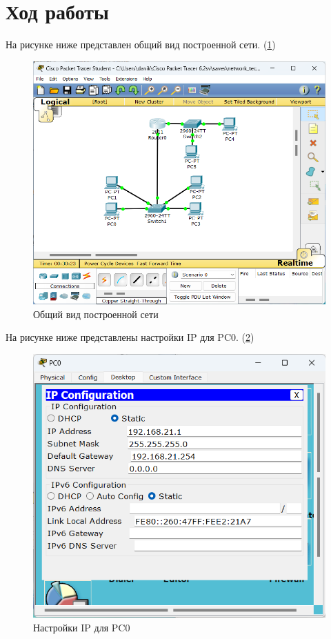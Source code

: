 \documentclass[14pt]{extarticle}
\makeatletter
\newcommand{\numbersections}{\renewcommand{\Hy@numberline}[1]{##1~}}
\let\oldsection\section
\renewcommand{\section}{\numbersections\oldsection}
\makeatother
\begin{document}
\section{Ход работы}

На рисунке ниже представлен общий вид построенной сети. (\ref{img:ОбщийВид})

\begin{figure}[H]
    \centering
    \includegraphics[width=1.0\linewidth]{ОбщийВид.png}
    \caption{Общий вид построенной сети\label{img:ОбщийВид}}
\end{figure}

На рисунке ниже представлены настройки IP для PC0. (\ref{img:PC0})

\begin{figure}[H]
    \centering
    \includegraphics[width=1.0\linewidth]{PC0.png}
    \caption{Настройки IP для PC0\label{img:PC0}}
\end{figure}
\end{document}
